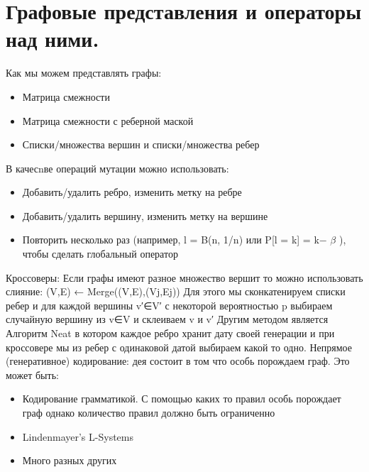 \section{Графовые представления и операторы над ними.}
Как мы можем представлять графы:
\begin{itemize}
	\item Матрица смежности
	\item Матрица смежности с реберной маской
	\item Списки/множества вершин и списки/множества ребер
\end{itemize}
В качесnве операций мутации можно использовать:
\begin{itemize}
	\item Добавить/удалить ребро, изменить метку на ребре
	\item Добавить/удалить вершину, изменить метку на вершине
	\item Повторить несколько раз (например, l = B(n, 1/n) или P[l = k] = k− $\beta$ ), чтобы сделать глобальный оператор
\end{itemize}
Кроссоверы:
Если графы имеют разное множество вершит то можно использовать слияние: (V,E) ← Merge((V,E),(Vj,Ej))
Для этого мы сконкатенируем списки ребер и для каждой вершины v′∈V′ с некоторой вероятностью p выбираем случайную вершину из v∈V и склеиваем v и v′
Другим методом является Алгоритм Neat в котором каждое ребро хранит дату своей генерации и при кроссовере мы из ребер с одинаковой датой выбираем какой то одно. 
Непрямое (генеративное) кодирование:
дея состоит в том что особь порождаем граф. Это может быть:
\begin{itemize}
	\item Кодирование грамматикой. С помощью каких то правил особь порождает граф однако количество правил должно быть ограниченно 
	\item Lindenmayer’s L-Systems
	\item Много разных других
\end{itemize}
